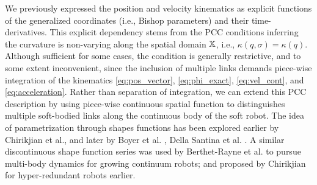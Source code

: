 \noindent We previously expressed the position and velocity kinematics as explicit functions of the generalized coordinates (i.e., Bishop parameters) and their time-derivatives. This explicit dependency stems from the PCC conditions inferring the curvature is non-varying along the spatial domain $\mathbb{X}$, i.e., $\kappa(q,\sigma) = \kappa(q)$. Although sufficient for some cases, the condition is generally restrictive, and to some extent inconvenient, since the inclusion of multiple links demands piece-wise integration of the kinematics \eqref{eq:pos_vector}, \eqref{eq:phi_exact}, \eqref{eq:vel_cont}, and \eqref{eq:acceleration}. Rather than separation of integration, we can extend this PCC description by using piece-wise continuous spatial function to distinguishes multiple soft-bodied links along the continuous body of the soft robot. The idea of parametrization through shapes functions has been explored earlier by Chirikjian et al.\cite{Chirikjian1994,Chirikjian1992}, and later by Boyer et al. \cite{Boyer2021}, Della Santina et al. \cite{Santina2020b}. A similar discontinuous shape function series was used by Berthet-Rayne et al. \cite{Berthet2021} to pursue multi-body dynamics for growing continuum robots; and proposed by Chirikjian \cite{Chirikjian1992} for hyper-redundant robots earlier.

